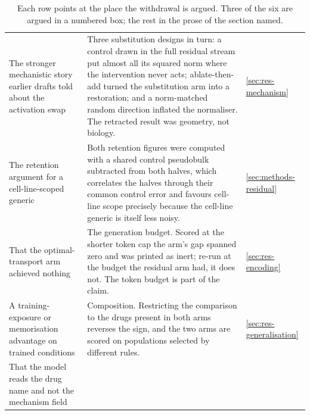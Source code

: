 \begin{table}[htbp]
\caption[The six corrections this thesis records against itself]{ Each row points at the
place the withdrawal is argued. Three of the six are argued in a numbered box;
the rest in the prose of the section named.}
\label{tab:corrections}
\begin{fullwidth}
\begin{threeparttable}
\begin{tabularx}{\linewidth}{@{}L{46mm} Y l@{}}
 &  &  \\
\midrule
The stronger mechanistic story earlier drafts told about the activation swap
  & Three substitution designs in turn: a control drawn in the full residual
    stream put almost all its squared norm where the intervention never acts;
    ablate-then-add turned the substitution arm into a restoration; and a
    norm-matched random direction inflated the normaliser. The retracted result
    was geometry, not biology.
  & \cref{sec:res-mechanism} \\
\addlinespace[10pt]
The retention argument for a cell-line-scoped generic
  & Both retention figures were computed with a shared control pseudobulk
    subtracted from both halves, which correlates the halves through their
    common control error and favours cell-line scope precisely because the
    cell-line generic is itself less noisy.
  & \cref{sec:methods-residual} \\
\addlinespace[10pt]
That the optimal-transport arm achieved nothing
  & The generation budget. Scored at the shorter token cap the arm's gap spanned
    zero and was printed as inert; re-run at the budget the residual arm had, it
    does not. The token budget is part of the claim.
  & \cref{sec:res-encoding} \\
\addlinespace[10pt]
A training-exposure or memorisation advantage on trained conditions
  & Composition. Restricting the comparison to the drugs present in both arms
    reverses the sign, and the two arms are scored on populations selected by
    different rules.
  & \cref{sec:res-generalisation} \\
\addlinespace[10pt]
That the model reads the drug name and not the mechanism field

\end{tabularx}
\end{threeparttable}
\end{fullwidth}
\end{table}
